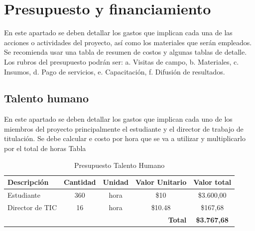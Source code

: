 

\clearpage
\section{Presupuesto y financiamiento}
En este apartado se deben detallar los gastos que implican cada una de las acciones o actividades del proyecto, así como los materiales que serán empleados. Se recomienda usar una tabla de resumen de costos y algunas tablas de detalle. Los rubros del presupuesto podrán ser: a. Visitas de campo, b. Materiales, c. Insumos, d. Pago de servicios, e. Capacitación, f. Difusión de resultados.
\subsection{Talento humano}
En este apartado se deben detallar los gastos que implican cada uno de los miembros del proyecto principalmente el estudiante y el director de trabajo de titulación. Se debe calcular e costo por hora que se va a utilizar y multiplicarlo por el total de horas Tabla \begin{table}[H]
\centering
\caption{Presupuesto Talento Humano}
\label{tab:presupuesto-talento}
\begin{tabular}{|l|c|c|c|c|}
\hline
\rowcolor[HTML]{B6DAF8}
\textbf{Descripción} & \textbf{Cantidad} & \textbf{Unidad} & \textbf{Valor Unitario} & \textbf{Valor total} \\ \hline
Estudiante           & 360               & hora            & \$10                    & \$3.600,00            \\ \hline
Director de TIC      & 16                & hora            & \$10.48                 & \$167,68              \\ \hline
\multicolumn{4}{|r|}{\textbf{Total}}                         & \textbf{\$3.767,68}     \\ \hline
\end{tabular}
\end{table}


